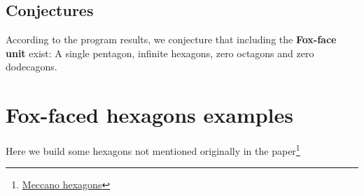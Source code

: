 \documentclass[11pt]{article}
\begin{document}
\subsection{Conjectures}

According to the program results, we conjecture that including the \textbf{Fox-face unit} exist: A single pentagon, infinite hexagons, zero octagons and zero dodecagons. 

\section{Fox-faced hexagons examples}

Here we build some hexagons not mentioned originally in the paper\footnote{
\href{https://github.com/heptagons/meccano/tree/main/hexa/hexagons.pdf}{Meccano hexagons}	
}
\end{document}
